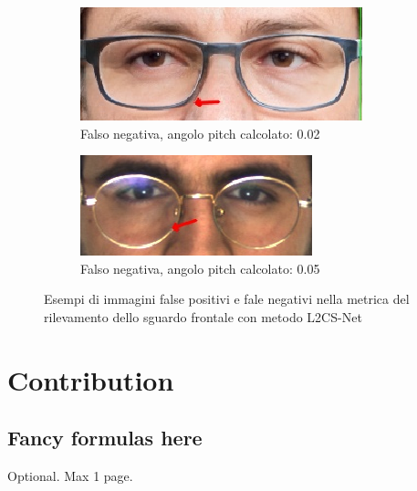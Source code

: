 \documentclass[12pt,a4paper,openright,twoside]{book}
\begin{document}
\begin{figure}[htbp]
    \begin{subfigure}{0.49\textwidth}
        \centering
        \includegraphics[width=.7\linewidth]{figures/frontal-gaze-l2cs-false-positive-97-1.png}
        \caption{Falso negativa, angolo pitch calcolato: 0.02}
        \label{fig:frontal_gaze_l2cs_false_positive}
    \end{subfigure}
    \hfill
    \centering
    \begin{subfigure}{0.49\textwidth}
        \centering
        \includegraphics[width=.7\linewidth]{figures/frontal-gaze-l2cs-false-negative-65-1.png}
        \caption{Falso negativa, angolo pitch calcolato: 0.05}
        \label{fig:frontal_gaze_l2cs_false_negative}
    \end{subfigure}
    \label{fig:frontal_gaze_l2cs_weakness}
    \caption{Esempi di immagini false positivi e fale negativi nella metrica del rilevamento dello sguardo frontale con metodo L2CS-Net}
\end{figure}

\chapter{Contribution}


\section{Fancy formulas here}


\backmatter

\nocite{*} %






\begin{acknowledgements} %
Optional. Max 1 page.
\end{acknowledgements}
\end{document}
